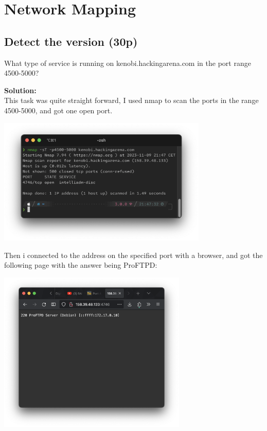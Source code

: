 \newpage
\section{Network Mapping}

\subsection{Detect the version (30p)}
What type of service is running on kenobi.hackingarena.com in the port range 4500-5000?

\textbf{Solution:}\\
This task was quite straight forward, I used nmap to scan the ports in the range 4500-5000, and got one open port.

\begin{center}
    \includegraphics[width=10cm]{img/Network mapping/Detect the version/Screenshot 2023-11-09 at 21.47.37.png}
\end{center}

Then i connected to the address on the specified port with a browser, and got the following page with the answer being ProFTPD:

\begin{center}
    \includegraphics[width=9cm]{img/Network mapping/Detect the version/Skjermbilde 2023-09-10 kl. 19.31.52.png}
\end{center}
    
